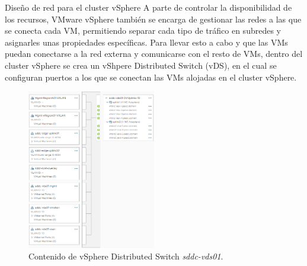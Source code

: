 \begin{subsubsection}{Diseño de red para el cluster vSphere}
  A parte de controlar la disponibilidad de los recursos, VMware vSphere también se encarga de gestionar las redes a las que se conecta cada VM, permitiendo separar cada tipo de tráfico en subredes y asignarles unas propiedades específicas. Para llevar esto a cabo y que las VMs puedan conectarse a la red externa y comunicarse con el resto de VMs, dentro del cluster vSphere se crea un vShpere Distributed Switch (vDS), en el cual se configuran puertos a los que se conectan las VMs alojadas en el cluster vSphere.
  \begin{figure}[h]
    \centering
    \includegraphics[width=0.5\textwidth]{imaxes/pruebaconcepto/distributedSwitchEntornoFinal.png}
    \caption{Contenido de vSphere Distributed Switch \textit{sddc-vds01}.}
    \label{fig:port-groups-vSwitch-vSphere}
  \end{figure}
  \FloatBarrier


\end{subsubsection}
